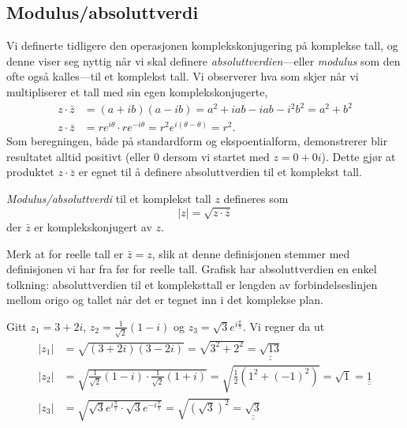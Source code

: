 \documentclass[a4paper,norsk,12pt]{article}
\newcommand{\ans}[1]{\underline{\underline{#1}}}
\newcounter{exa}
\begin{document}
\subsection{Modulus/absoluttverdi}
Vi definerte tidligere den operasjonen komplekskonjugering på komplekse tall, og denne viser seg nyttig når vi skal definere \emph{absoluttverdien}---eller \emph{modulus} som den ofte også kalles---til et komplekst tall. Vi observerer hva som skjer når vi multipliserer et tall med sin egen komplekskonjugerte,
\begin{align*}
	z\cdot\bar{z} &= (a + ib)(a-ib) = a^2 + iab - iab -i^2b^2 = a^2 + b^2 \\
	z\cdot\bar{z} &= re^{i\theta}\cdot re^{-i\theta} = r^2e^{i(\theta-\theta)} = r^2.
\end{align*}
Som beregningen, både på standardform og ekspoentialform, demonstrerer blir resultatet alltid positivt (eller 0 dersom vi startet med $z=0+0i$). Dette gjør at produktet $z\cdot\bar{z}$ er egnet til å definere absoluttverdien til et komplekst tall.
\begin{tdef}
\emph{Modulus/absoluttverdi} til et komplekst tall $z$ defineres som
\begin{displaymath}
	|z| = \sqrt{z\cdot\bar{z}}
\end{displaymath}
der $\bar{z}$ er komplekskonjugert av $z$.
\end{tdef}
\noindent
Merk at for reelle tall er $\bar{z}=z$, slik at denne definisjonen stemmer med definisjonen vi har fra før for reelle tall. 
Grafisk har absoluttverdien en enkel tolkning: absoluttverdien til et kompleksttall er lengden av forbindelseslinjen mellom origo og tallet når det er tegnet inn i det komplekse plan.

\begin{texample}
Gitt $z_1 = 3 + 2i$, $z_2 = \frac{1}{\sqrt{2}}(1-i)$ og $z_3 = \sqrt{3}e^{i\frac{\pi}{7}}$. Vi regner da ut
\begin{align*}
	|z_1| &= \sqrt{(3+2i)(3-2i)} = \sqrt{3^2 + 2^2} = \ans{\sqrt{13}}\\[12pt]
	|z_2| &= \sqrt{\frac{1}{\sqrt{2}}(1-i)\cdot\frac{1}{\sqrt{2}}(1+i)} = \sqrt{\frac12 \left(1^2 + (-1)^2\right)} = \sqrt{1} = \ans{1}\\[12pt]
	|z_3| &= \sqrt{\sqrt{3}e^{i\frac{\pi}{7}}\cdot\sqrt{3}e^{-i\frac{\pi}{7}}} = \sqrt{(\sqrt{3})^2} = \ans{\sqrt{3}}
\end{align*}
\end{texample}
\end{document}
